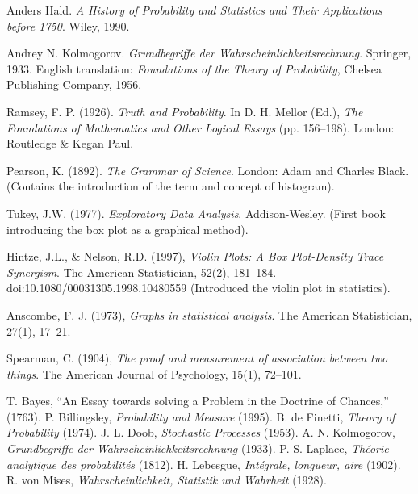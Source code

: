 \documentclass{book}
\begin{document}
\begin{thebibliography}{999}
Anders Hald.  
\textit{A History of Probability and Statistics and Their Applications before 1750}.  
Wiley, 1990.

Andrey N. Kolmogorov.  
\textit{Grundbegriffe der Wahrscheinlichkeitsrechnung}.  
Springer, 1933. English translation: \textit{Foundations of the Theory of Probability}, Chelsea Publishing Company, 1956.


Ramsey, F. P. (1926). 
\textit{Truth and Probability}. In D. H. Mellor (Ed.), \textit{The Foundations of Mathematics and Other Logical Essays} (pp. 156–198). 
London: Routledge \& Kegan Paul.

Pearson, K. (1892).
\textit{The Grammar of Science}.
London: Adam and Charles Black. (Contains the introduction of the term and concept of histogram).

Tukey, J.W. (1977). 
\textit{Exploratory Data Analysis}.
Addison-Wesley.  (First book introducing the box plot as a graphical method).

Hintze, J.L., \& Nelson, R.D. (1997),
\textit{Violin Plots: A Box Plot-Density Trace Synergism}.
The American Statistician, 52(2), 181–184. doi:10.1080/00031305.1998.10480559 (Introduced the violin plot in statistics).

Anscombe, F. J. (1973),
\textit{Graphs in statistical analysis}. 
The American Statistician, 27(1), 17--21.

Spearman, C. (1904),
\textit{The proof and measurement of association between two things}. 
The American Journal of Psychology, 15(1), 72--101.


 T. Bayes, ``An Essay towards solving a Problem in the Doctrine of Chances,'' (1763).
 P. Billingsley, \emph{Probability and Measure} (1995).
 B. de Finetti, \emph{Theory of Probability} (1974).
 J. L. Doob, \emph{Stochastic Processes} (1953).
 A. N. Kolmogorov, \emph{Grundbegriffe der Wahrscheinlichkeitsrechnung} (1933).
 P.-S. Laplace, \emph{Théorie analytique des probabilités} (1812).
 H. Lebesgue, \emph{Intégrale, longueur, aire} (1902).
 R. von Mises, \emph{Wahrscheinlichkeit, Statistik und Wahrheit} (1928).


\end{thebibliography}
\end{document}
